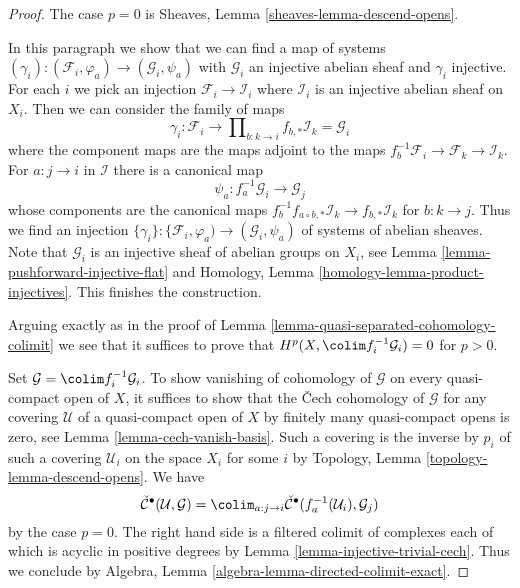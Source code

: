\begin{proof}
The case $p = 0$ is Sheaves, Lemma \ref{sheaves-lemma-descend-opens}.

\medskip\noindent
In this paragraph we show that we can find a map of systems
$(\gamma_i) : (\mathcal{F}_i, \varphi_a) \to (\mathcal{G}_i, \psi_a)$
with $\mathcal{G}_i$ an injective abelian sheaf and $\gamma_i$ injective.
For each $i$ we pick an injection $\mathcal{F}_i \to \mathcal{I}_i$
where $\mathcal{I}_i$ is an injective abelian sheaf on $X_i$.
Then we can consider the family of maps
$$
\gamma_i :
\mathcal{F}_i
\longrightarrow
\prod\nolimits_{b : k \to i} f_{b, *}\mathcal{I}_k = \mathcal{G}_i
$$
where the component maps are the maps adjoint to the maps
$f_b^{-1}\mathcal{F}_i \to \mathcal{F}_k \to \mathcal{I}_k$.
For $a : j \to i$ in $\mathcal{I}$ there is a canonical map
$$
\psi_a : f_a^{-1}\mathcal{G}_i \to \mathcal{G}_j
$$
whose components are the canonical maps
$f_b^{-1}f_{a \circ b, *}\mathcal{I}_k \to f_{b, *}\mathcal{I}_k$
for $b : k \to j$. Thus we find an injection
$\{\gamma_i\} : \{\mathcal{F}_i, \varphi_a) \to (\mathcal{G}_i, \psi_a)$
of systems of abelian sheaves. Note that $\mathcal{G}_i$ is an injective
sheaf of abelian groups on $X_i$, see
Lemma \ref{lemma-pushforward-injective-flat} and
Homology, Lemma \ref{homology-lemma-product-injectives}.
This finishes the construction.

\medskip\noindent
Arguing exactly as in the proof of
Lemma \ref{lemma-quasi-separated-cohomology-colimit}
we see that it suffices to prove that
$H^p(X, \colim f_i^{-1}\mathcal{G}_i) = 0$ for $p > 0$.

\medskip\noindent
Set $\mathcal{G} = \colim f_i^{-1}\mathcal{G}_i$.
To show vanishing of cohomology of $\mathcal{G}$ on every quasi-compact
open of $X$, it suffices to show that the {\v C}ech cohomology of
$\mathcal{G}$ for any covering $\mathcal{U}$ of a quasi-compact open of
$X$ by finitely many quasi-compact opens is zero, see
Lemma \ref{lemma-cech-vanish-basis}.
Such a covering is the inverse by $p_i$ of such a covering $\mathcal{U}_i$
on the space $X_i$ for some $i$ by
Topology, Lemma \ref{topology-lemma-descend-opens}. We have
$$
\check{\mathcal{C}}^\bullet(\mathcal{U}, \mathcal{G}) =
\colim_{a : j \to i}
\check{\mathcal{C}}^\bullet(f_a^{-1}(\mathcal{U}_i), \mathcal{G}_j)
$$
by the case $p = 0$. The right hand side is a filtered colimit of
complexes each of which is acyclic in positive degrees by
Lemma \ref{lemma-injective-trivial-cech}. Thus we conclude by
Algebra, Lemma \ref{algebra-lemma-directed-colimit-exact}.
\end{proof}









